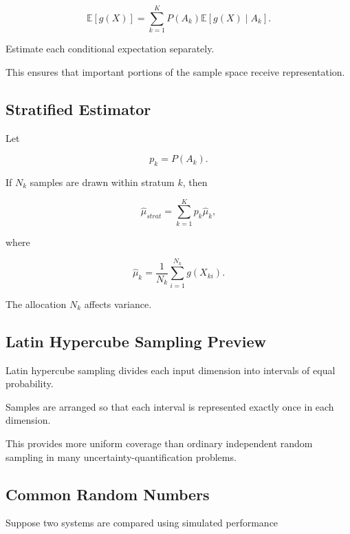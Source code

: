 \[
\boxed{
\mathbb{E}[g(X)]
=
\sum_{k=1}^{K}
P(A_k)
\mathbb{E}
[
g(X)
\mid
A_k
].
}
\]

Estimate each conditional expectation separately.

This ensures that important portions of the sample space receive
representation.

\subsection{Stratified Estimator}
\label{subsec:stratified-estimator}

Let

\[
p_k=P(A_k).
\]

If \(N_k\) samples are drawn within stratum \(k\), then

\[
\boxed{
\widehat{\mu}_{strat}
=
\sum_{k=1}^{K}
p_k
\widehat{\mu}_k,
}
\]

where

\[
\boxed{
\widehat{\mu}_k
=
\frac1{N_k}
\sum_{i=1}^{N_k}
g(X_{ki}).
}
\]

The allocation \(N_k\) affects variance.

\subsection{Latin Hypercube Sampling Preview}
\label{subsec:latin-hypercube}

Latin hypercube sampling divides each input dimension into intervals of
equal probability.

Samples are arranged so that each interval is represented exactly once in
each dimension.

This provides more uniform coverage than ordinary independent random
sampling in many uncertainty-quantification problems.

\subsection{Common Random Numbers}
\label{subsec:common-random-numbers}

Suppose two systems are compared using simulated performance

